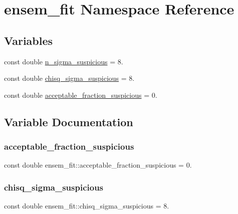 \hypertarget{namespaceensem__fit}{}\section{ensem\+\_\+fit Namespace Reference}
\label{namespaceensem__fit}
\subsection*{Variables}
\begin{DoxyCompactItemize}
\item 
const double \mbox{\hyperlink{namespaceensem__fit_af476a00fc984ed4f077b420fc020894a}{n\+\_\+sigma\+\_\+suspicious}} = 8.
\item 
const double \mbox{\hyperlink{namespaceensem__fit_a92ef826b28e7bd9fadea248bab20ee7b}{chisq\+\_\+sigma\+\_\+suspicious}} = 8.
\item 
const double \mbox{\hyperlink{namespaceensem__fit_acb51db00fc395dea2907e30a3b3ea989}{acceptable\+\_\+fraction\+\_\+suspicious}} = 0.
\end{DoxyCompactItemize}


\subsection{Variable Documentation}
\mbox{\label{namespaceensem__fit_acb51db00fc395dea2907e30a3b3ea989}} 
\subsubsection{\texorpdfstring{acceptable\_fraction\_suspicious}{acceptable\_fraction\_suspicious}}
{\footnotesize\ttfamily const double ensem\+\_\+fit\+::acceptable\+\_\+fraction\+\_\+suspicious = 0.}

\mbox{\label{namespaceensem__fit_a92ef826b28e7bd9fadea248bab20ee7b}} 
\subsubsection{\texorpdfstring{chisq\_sigma\_suspicious}{chisq\_sigma\_suspicious}}
{\footnotesize\ttfamily const double ensem\+\_\+fit\+::chisq\+\_\+sigma\+\_\+suspicious = 8.}

